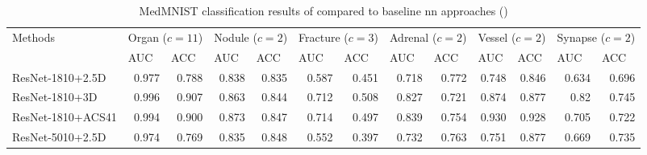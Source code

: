 
\begin{table*}[t!]
\centering
\caption{MedMNIST classification results of compared to baseline \ac{nn} approaches (\citep{medmnist})} \label{tab:medmnist}
\begin{tabular}{|l|rr|rr|rr|rr|rr|rr|}
\hline
\multirow{2}{*}{Methods}                & \multicolumn{2}{c}{Organ ($c=11$)}                  & \multicolumn{2}{c}{Nodule ($c=2$)}                 & \multicolumn{2}{c}{Fracture ($c=3$)}               & \multicolumn{2}{c}{Adrenal ($c=2$)}                & \multicolumn{2}{c}{Vessel ($c=2$)}                 & \multicolumn{2}{c|}{Synapse ($c=2$)}                \\
                         & \multicolumn{1}{l}{AUC} & \multicolumn{1}{l}{ACC} & \multicolumn{1}{l}{AUC} & \multicolumn{1}{l}{ACC} & \multicolumn{1}{l}{AUC} & \multicolumn{1}{l}{ACC} & \multicolumn{1}{l}{AUC} & \multicolumn{1}{l}{ACC} & \multicolumn{1}{l}{AUC} & \multicolumn{1}{l}{ACC} & \multicolumn{1}{l}{AUC} & \multicolumn{1}{l|}{ACC} \\ \hline
ResNet-1810+2.5D        & 0.977                   & 0.788                   & 0.838                   & 0.835                   & 0.587                   & 0.451                   & 0.718                   & 0.772                   & 0.748                   & 0.846                   & 0.634                   & 0.696                   \\
ResNet-1810+3D          & 0.996                   & 0.907                   & 0.863                   & 0.844                   & 0.712                   & 0.508                   & 0.827                   & 0.721                   & 0.874                   & 0.877                   & 0.82                    & 0.745                   \\
ResNet-1810+ACS41       & 0.994                   & 0.900                     & 0.873                   & 0.847                   & 0.714                   & 0.497                   & 0.839                   & 0.754                   & 0.930                    & 0.928                   & 0.705                   & 0.722                   \\
ResNet-5010+2.5D        & 0.974                   & 0.769                   & 0.835                   & 0.848                   & 0.552                   & 0.397                   & 0.732                   & 0.763                   & 0.751                   & 0.877                   & 0.669                   & 0.735                   \\

\end{tabular}
\end{table*}
